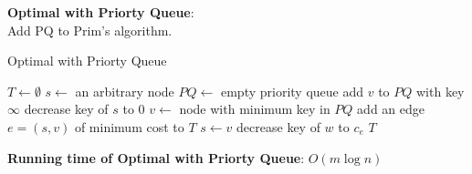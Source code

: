 \documentclass[onecolumn]{report}
\begin{document}
\noindent
\textbf{Optimal with Priorty Queue}:\\
Add PQ to Prim's algorithm.\\
\begin{algorithm}[H]
\caption{Optimal with Priorty Queue}
\begin{algorithmic}[1]
\State $T \gets \emptyset$
\State $s \gets$ an arbitrary node
\State $PQ \gets$ empty priority queue
\State add $v$ to $PQ$ with key $\infty$
\EndFor
\State decrease key of $s$ to 0
\State $v \gets$ node with minimum key in $PQ$
\State add an edge $e=(s,v)$ of minimum cost to $T$
\State $s \gets v$
\State decrease key of $w$ to $c_e$
\EndIf
\EndFor
\EndWhile
\State \Return $T$
\EndProcedure
\end{algorithmic}
\end{algorithm}
\noindent
\textbf{Running time of Optimal with Priorty Queue}: $O(m\log n)$\\
\end{document}
